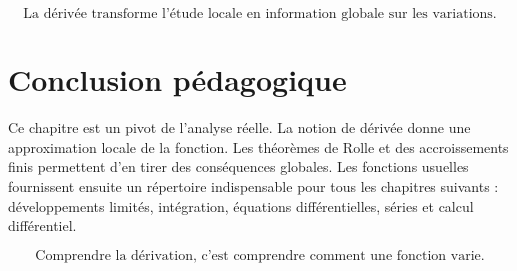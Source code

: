 \documentclass[11pt,a4paper]{article}
\begin{document}
\begin{center}
\[
\boxed{
\text{La dérivée transforme l'étude locale en information globale sur les variations.}
}
\]
\end{center}

\section*{Conclusion pédagogique}

Ce chapitre est un pivot de l'analyse réelle.  
La notion de dérivée donne une approximation locale de la fonction.  
Les théorèmes de Rolle et des accroissements finis permettent d'en tirer des conséquences globales.  
Les fonctions usuelles fournissent ensuite un répertoire indispensable pour tous les chapitres suivants : développements limités, intégration, équations différentielles, séries et calcul différentiel.

\begin{center}
\[
\boxed{
\text{Comprendre la dérivation, c'est comprendre comment une fonction varie.}
}
\]
\end{center}
\end{document}
